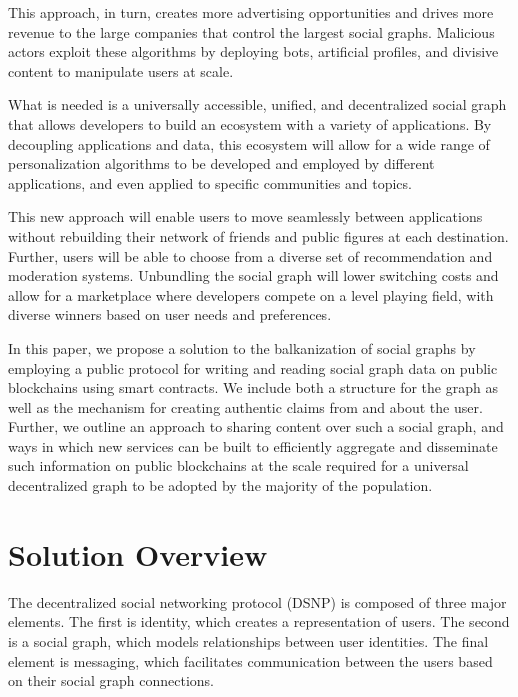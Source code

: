 \documentclass[12pt,letterpaper]{article}
\begin{document}
This approach, in turn, creates more advertising opportunities and drives more revenue to
the large companies that control the largest social graphs. Malicious actors exploit these
algorithms by deploying bots, artificial profiles, and divisive content to manipulate
users at scale.


What is needed is a universally accessible, unified, and decentralized social graph that
allows developers to build an ecosystem with a variety of applications. By decoupling
applications and data, this ecosystem will allow for a wide range of personalization
algorithms to be developed and employed by different applications, and even applied to
specific communities and topics.

This new approach will enable users to move seamlessly between applications without
rebuilding their network of friends and public figures at each destination. Further, users
will be able to choose from a diverse set of recommendation and moderation systems.
Unbundling the social graph will lower switching costs and allow for a marketplace where
developers compete on a level playing field, with diverse winners based on user needs and
preferences.


In this paper, we propose a solution to the balkanization of social graphs by employing a
public protocol for writing and reading social graph data on public blockchains using
smart contracts. We include both a structure for the graph as well as the mechanism for
creating authentic claims from and about the user. Further, we outline an approach to
sharing content over such a social graph, and ways in which new services can be built to
efficiently aggregate and disseminate such information on public blockchains at the scale
required for a universal decentralized graph to be adopted by the majority of the
population.

\section{Solution Overview}\label{sec:solution_overview}

The decentralized social networking protocol (DSNP) is composed of three major elements.
The first is identity, which creates a representation of users. The second is a social
graph, which models relationships between user identities. The final element is messaging,
which facilitates communication between the users based on their social graph connections.
\end{document}
